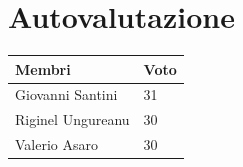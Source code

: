 \documentclass{report}
\begin{document}
\section{Autovalutazione}

\begin{center} %
	\centering
	\begin{tabular}{ |p{3cm}|p{1cm}|  }
		\hline
		\centering  Membri  & Voto\\ %
		\hline
		\centering Giovanni Santini & 31 \\
		\hline
		\centering Riginel Ungureanu & 30  \\
		\hline
		\centering Valerio Asaro & 30  \\
		\hline
	\end{tabular}
\end{center}



	
\end{document}
